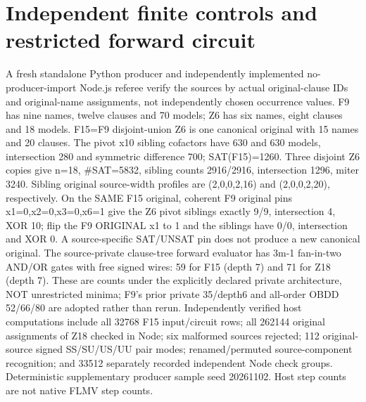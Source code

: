 \documentclass[11pt]{article}
\begin{document}
\section{Independent finite controls and restricted forward circuit}
A fresh standalone Python producer and independently implemented no-producer-import Node.js referee verify the sources by actual original-clause IDs and original-name assignments, not independently chosen occurrence values. F9 has nine names, twelve clauses and 70 models; Z6 has six names, eight clauses and 18 models. F15=F9 disjoint-union Z6 is one canonical original with 15 names and 20 clauses. The pivot x10 sibling cofactors have 630 and 630 models, intersection 280 and symmetric difference 700; SAT(F15)=1260. Three disjoint Z6 copies give n=18, #SAT=5832, sibling counts 2916/2916, intersection 1296, miter 3240. Sibling original source-width profiles are (2,0,0,2,16) and (2,0,0,2,20), respectively.
On the SAME F15 original, coherent F9 original pins x1=0,x2=0,x3=0,x6=1 give the Z6 pivot siblings exactly 9/9, intersection 4, XOR 10; flip the F9 ORIGINAL x1 to 1 and the siblings have 0/0, intersection and XOR 0. A source-specific SAT/UNSAT pin does not produce a new canonical original. The source-private clause-tree forward evaluator has 3m-1 fan-in-two AND/OR gates with free signed wires: 59 for F15 (depth 7) and 71 for Z18 (depth 7). These are counts under the explicitly declared private architecture, NOT unrestricted minima; F9's prior private 35/depth6 and all-order OBDD 52/66/80 are adopted rather than rerun. Independently verified host computations include all 32768 F15 input/circuit rows; all 262144 original assignments of Z18 checked in Node; six malformed sources rejected; 112 original-source signed SS/SU/US/UU pair modes; renamed/permuted source-component recognition; and 33512 separately recorded independent Node check groups. Deterministic supplementary producer sample seed 20261102. Host step counts are not native FLMV step counts.
\end{document}
